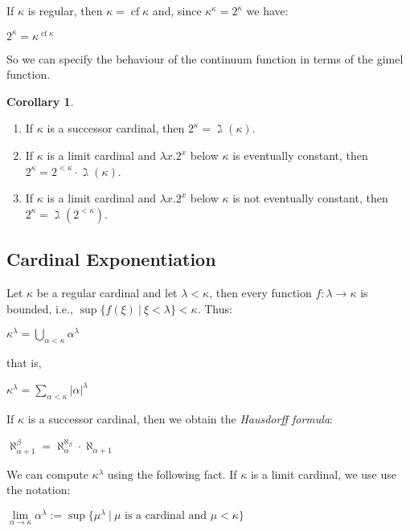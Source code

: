 \documentclass[8pt]{article}
\theoremstyle{definition}
\theoremstyle{definition}
\theoremstyle{definition}
\theoremstyle{definition}
\theoremstyle{definition}
\theoremstyle{definition}
\theoremstyle{definition}
\theoremstyle{definition}
\theoremstyle{definition}
\theoremstyle{definition}
\theoremstyle{definition}
\theoremstyle{definition}
\theoremstyle{definition}
\theoremstyle{definition}
\newtheorem{col}{Corollary}[section]
\theoremstyle{question}
\begin{document}
If $\kappa$ is regular, then $\kappa = \operatorname{cf} \kappa$ and, since 
$\kappa^{\kappa} = 2^{\kappa}$ we have:
\begin{center}
  $2^{\kappa} = \kappa^{\operatorname{cf} \kappa}$
\end{center}

So we can specify the behaviour of the continuum function in terms of the gimel function.
\begin{col}
  $ $

  \begin{enumerate}
    \item If $\kappa$ is a successor cardinal, then $2^{\kappa} = \gimel(\kappa)$.
    \item If $\kappa$ is a limit cardinal and $\lambda x. 2^x$ below $\kappa$ is eventually constant, then
    $2^{\kappa} = 2^{<\kappa} \cdot \gimel(\kappa)$.
    \item If $\kappa$ is a limit cardinal and $\lambda x. 2^x$ below $\kappa$ is not eventually constant, then
    $2^{\kappa} = \gimel( 2^{<\kappa})$.
  \end{enumerate}
\end{col}

\subsection{Cardinal Exponentiation}

Let $\kappa$ be a regular cardinal and let $\lambda < \kappa$, then every function $f : \lambda \to \kappa$ is bounded,
i.e., $\sup \{ f(\xi) \: | \: \xi < \lambda \} < \kappa$. Thus:
\begin{center}
  $\kappa^{\lambda} = \bigcup \limits_{\alpha < \kappa} \alpha^{\lambda}$
\end{center}
that is,
\begin{center}
  $\kappa^{\lambda} = \sum \limits_{\alpha < \kappa} |\alpha|^{\lambda}$
\end{center}
If $\kappa$ is a successor cardinal, then we obtain the \emph{Hausdorff formula}:
\begin{center}
  $\aleph_{\alpha + 1}^{\beta} = \aleph_{\alpha}^{\aleph_{\beta}} \cdot \aleph_{\alpha + 1}$
\end{center}

We can compute $\kappa^{\lambda}$ using the following fact.
If $\kappa$ is a limit cardinal, we use use the notation:
\begin{center}
  $\lim \limits_{\alpha \to \kappa} \alpha^{\lambda} := \sup \{ \mu^{\lambda} \: | \: \text{$\mu$ is a cardinal and $\mu < \kappa$}\}$
\end{center}
\end{document}
